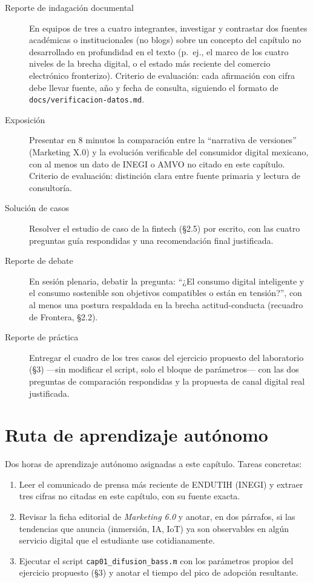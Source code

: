 \begin{description}
  \item[Reporte de indagación documental] En equipos de tres a cuatro
  integrantes, investigar y contrastar dos fuentes académicas o
  institucionales (no blogs) sobre un concepto del capítulo no desarrollado
  en profundidad en el texto (p.\ ej., el marco de los cuatro niveles de la
  brecha digital, o el estado más reciente del comercio electrónico
  fronterizo). Criterio de evaluación: cada afirmación con cifra debe llevar
  fuente, año y fecha de consulta, siguiendo el formato de
  \texttt{docs/verificacion-datos.md}.
  \item[Exposición] Presentar en 8 minutos la comparación entre la
  \enquote{narrativa de versiones} (Marketing X.0) y la evolución verificable del
  consumidor digital mexicano, con al menos un dato de INEGI o AMVO no citado
  en este capítulo. Criterio de evaluación: distinción clara entre fuente
  primaria y lectura de consultoría.
  \item[Solución de casos] Resolver el estudio de caso de la fintech
  (\S 2.5) por escrito, con las cuatro preguntas guía respondidas y una
  recomendación final justificada.
  \item[Reporte de debate] En sesión plenaria, debatir la pregunta: \enquote{¿El
  consumo digital inteligente y el consumo sostenible son objetivos
  compatibles o están en tensión?}, con al menos una postura respaldada en la
  brecha actitud-conducta (recuadro de Frontera, \S 2.2).
  \item[Reporte de práctica] Entregar el cuadro de los tres casos del
  ejercicio propuesto del laboratorio (\S 3) —sin modificar el script, solo
  el bloque de parámetros— con las dos preguntas de comparación respondidas
  y la propuesta de canal digital real justificada.
\end{description}

\section{Ruta de aprendizaje autónomo}

Dos horas de aprendizaje autónomo asignadas a este capítulo. Tareas
concretas:
\begin{enumerate}
  \item Leer el comunicado de prensa más reciente de ENDUTIH (INEGI) y
  extraer tres cifras no citadas en este capítulo, con su fuente exacta.
  \item Revisar la ficha editorial de \textit{Marketing 6.0}
  \parencite{kotler2024marketing6} y anotar, en dos párrafos, si las
  tendencias que anuncia (inmersión, IA, IoT) ya son observables en algún
  servicio digital que el estudiante use cotidianamente.
  \item Ejecutar el script \texttt{cap01\_difusion\_bass.m} con los
  parámetros propios del ejercicio propuesto (\S 3) y anotar el tiempo del
  pico de adopción resultante.
\end{enumerate}


